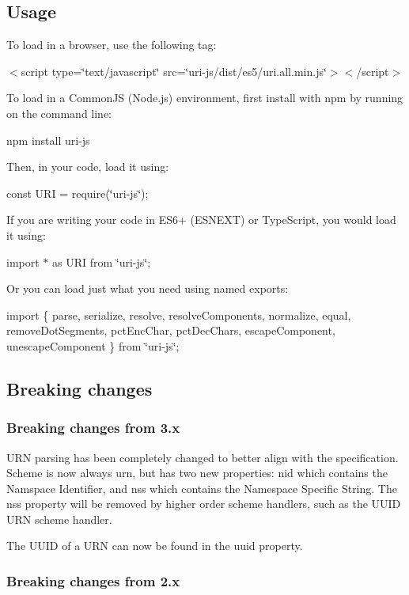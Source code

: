 \subsection*{Usage}

To load in a browser, use the following tag\+:

$<$script type=\char`\"{}text/javascript\char`\"{} src=\char`\"{}uri-\/js/dist/es5/uri.\+all.\+min.\+js\char`\"{}$>$$<$/script$>$

To load in a Common\+JS (Node.\+js) environment, first install with npm by running on the command line\+:

npm install uri-\/js

Then, in your code, load it using\+:

const U\+RI = require(\char`\"{}uri-\/js\char`\"{});

If you are writing your code in E\+S6+ (E\+S\+N\+E\+XT) or Type\+Script, you would load it using\+:

import $\ast$ as U\+RI from \char`\"{}uri-\/js\char`\"{};

Or you can load just what you need using named exports\+:

import \{ parse, serialize, resolve, resolve\+Components, normalize, equal, remove\+Dot\+Segments, pct\+Enc\+Char, pct\+Dec\+Chars, escape\+Component, unescape\+Component \} from \char`\"{}uri-\/js\char`\"{};

\subsection*{Breaking changes}

\subsubsection*{Breaking changes from 3.\+x}

U\+RN parsing has been completely changed to better align with the specification. Scheme is now always {\ttfamily urn}, but has two new properties\+: {\ttfamily nid} which contains the Namspace Identifier, and {\ttfamily nss} which contains the Namespace Specific String. The {\ttfamily nss} property will be removed by higher order scheme handlers, such as the U\+U\+ID U\+RN scheme handler.

The U\+U\+ID of a U\+RN can now be found in the {\ttfamily uuid} property.

\subsubsection*{Breaking changes from 2.\+x}

